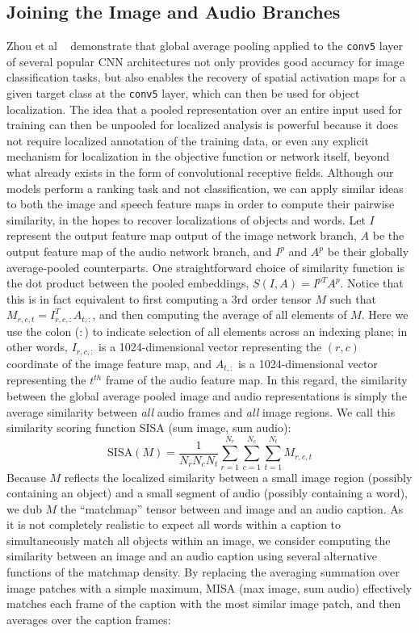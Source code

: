 \subsection{Joining the Image and Audio Branches}
\label{sec:joining}
Zhou et al ~\cite{zhou2015cnnlocalization} demonstrate that global average pooling applied to the \texttt{conv5} layer of several popular CNN architectures not only provides good accuracy for image classification tasks, but also enables the recovery of spatial activation maps for a given target class at the \texttt{conv5} layer, which can then be used for object localization. The idea that a pooled representation over an entire input used for training can then be unpooled for localized analysis is powerful because it does not require localized annotation of the training data, or even any explicit mechanism for localization in the objective function or network itself, beyond what already exists in the form of convolutional receptive fields. Although our models perform a ranking task and not classification, we can apply similar ideas to both the image and speech feature maps in order to compute their pairwise similarity, in the hopes to recover localizations of objects and words. Let $I$ represent the output feature map output of the image network branch, $A$ be the output feature map of the audio network branch, and $I^p$ and $A^p$ be their globally average-pooled counterparts. One straightforward choice of similarity function is the dot product between the pooled embeddings, $S(I, A) = I^{pT} A^p$. Notice that this is in fact equivalent to first computing a 3rd order tensor $M$ such that $M_{r,c,t} = I_{r, c, :}^{T} A_{t, :}$, and then computing the average of all elements of $M$. Here we use the colon ($:$) to indicate selection of all elements across an indexing plane; in other words, $I_{r, c, :}$ is a 1024-dimensional vector representing the $(r,c)$ coordinate of the image feature map, and $A_{t, :}$ is a 1024-dimensional vector representing the $t^{th}$ frame of the audio feature map. In this regard, the similarity between the global average pooled image and audio representations is simply the average similarity between \textit{all} audio frames and \textit{all} image regions. We call this similarity scoring function SISA (sum image, sum audio):
\begin{equation}
\text{SISA}(M) = \frac{1}{N_r N_c N_t}\sum_{r=1}^{N_r}\sum_{c=1}^{N_c}\sum_{t=1}^{N_t}{M_{r,c,t}}
\end{equation}
Because $M$ reflects the localized similarity between a small image region (possibly containing an object) and a small segment of audio (possibly containing a word), we dub $M$ the ``matchmap'' tensor between and image and an audio caption. As it is not completely realistic to expect all words within a caption to simultaneously match all objects within an image, we consider computing the similarity between an image and an audio caption using several alternative functions of the matchmap density. By replacing the averaging summation over image patches with a simple maximum, MISA (max image, sum audio) effectively matches each frame of the caption with the most similar image patch, and then averages over the caption frames:

